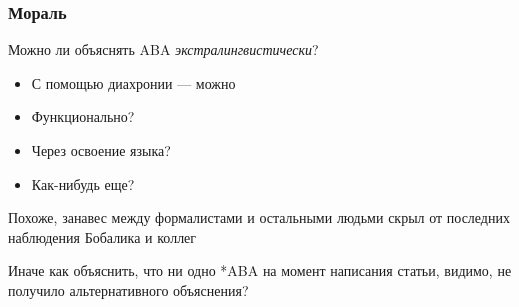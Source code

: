 \documentclass[9pt, t]{beamer}
\begin{document}
\begin{frame}
    \frametitle{Мораль}

    Можно ли объяснять ABA \textit{экстралингвистически}?
    \begin{itemize}
        \item С помощью диахронии — можно
        \item Функционально?
        \item Через освоение языка?
        \item Как-нибудь еще?
    \end{itemize}
    Похоже, занавес между формалистами и остальными людьми скрыл от последних наблюдения Бобалика и коллег
    
    Иначе как объяснить, что ни одно *ABA на момент написания статьи, видимо, не получило альтернативного объяснения?
    
\end{frame}
\end{document}
